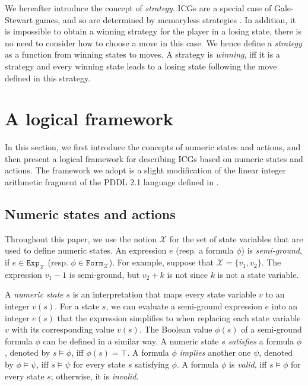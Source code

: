 \documentclass[review]{elsarticle}
\newcommand{\Exp}{\mathtt{Exp}}
\newcommand{\formula}{\mathtt{Form}}
\newcommand{\set}[1]{\{ #1 \}}
\newcommand{\true}{\top}
\newcommand{\statevar}{\mathcal{X}}
\begin{document}
	We hereafter introduce the concept of \textit{strategy}.
	ICGs are a special case of Gale-Stewart games, and so are determined by memoryless strategies \cite{GalS1953}.
	In addition, it is impossible to obtain a winning strategy for the player in a losing state, there is no need to consider how to choose a move in this case.
	We hence define a \textit{strategy} as a function from winning states to moves.
	A strategy is \textit{winning}, iff it is a strategy and every winning state leads to a losing state following the move defined in this strategy.


	
\section{A logical framework}
	In this section, we first introduce the concepts of numeric states and actions, and then present a logical framework for describing ICGs based on numeric states and actions.
	The framework we adopt is a slight modification of the linear integer arithmetic fragment of the PDDL 2.1 language defined in \cite{FoxL2003}.
	

	\subsection{Numeric states and actions}
	Throughout this paper, we use the notion $\statevar$ for the set of state variables that are used to define numeric states.
	An expression $e$ (resp. a formula $\phi$) is \textit{semi-ground}, if $e \in \Exp_{\statevar}$ (resp. $\phi \in \formula_{\statevar}$).
	For example, suppose that $\statevar = \set{v_1, v_2}$.
	The expression $v_1 - 1$ is semi-ground, but $v_2 + k$ is not since $k$ is not a state variable.
	
	
	A \textit{numeric state} $s$ is an interpretation that maps every state variable $v$ to an integer $v(s)$.
	For a state $s$, we can evaluate a semi-ground expression $e$ into an integer $e(s)$ that the expression simplifies to when replacing each state variable $v$ with its corresponding value $v(s)$.	
	The Boolean value $\phi(s)$ of a semi-ground formula $\phi$ can be defined in a similar way.
	A numeric state $s$ \textit{satisfies} a formula $\phi$, denoted by $s \models \phi$, iff $\phi(s) = \true$.
	A formula $\phi$ \textit{implies} another one $\psi$, denoted by $\phi \models \psi$, iff $s \models \psi$ for every state $s$ satisfying $\phi$.
	A formula $\phi$ is \textit{valid}, iff $s \models \phi$ for every state $s$; otherwise, it is \textit{invalid}.
	
\end{document}
